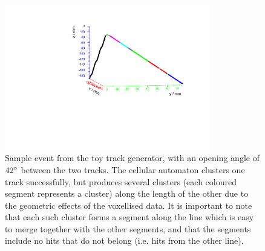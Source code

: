 \begin{figure}
\centering
\includegraphics[angle=-90,width=0.8\textwidth]{chapters/cellularautomaton_images/openingangle-event_16-42deg}
\caption[Sample CA reconstruction of toy event with $42\degree$ opening angle]{\label{fig:ca-openingangle-sample-event-raw}Sample event from the toy track generator, with an opening angle of $42\degree$ between the two tracks. The cellular automaton clusters one track successfully, but produces several clusters (each coloured segment represents a cluster) along the length of the other due to the geometric effects of the voxellised data. It is important to note that each such cluster forms a segment along the line which is easy to merge together with the other segments, and that the segments include no hits that do not belong (i.e. hits from the other line).}
\end{figure}

